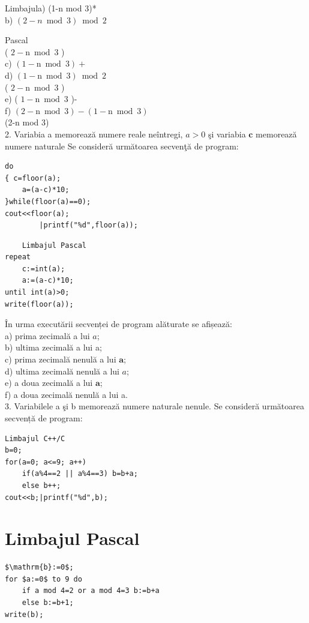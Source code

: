 \documentclass[10pt]{article}
\begin{document}
Limbajula) (1-n mod 3)*\\
b) $(2-n \bmod 3) \bmod 2$

Pascal\\
( $2-\mathrm{n} \bmod 3$ )\\
c) $(1-\mathrm{n} \bmod 3)+$\\
d) $(1-\mathrm{n} \bmod 3) \bmod 2$\\
( $2-\mathrm{n} \bmod 3$ )\\
e) ( $1-\mathrm{n} \bmod 3$ )-\\
f) $(2-\mathrm{n} \bmod 3)-(1-\mathrm{n} \bmod 3)$\\
(2-n mod 3)\\
2. Variabia a memorează numere reale neîntregi, $a>0$ şi variabia $\mathbf{c}$ memorează numere naturale Se consideră următoarea secvenţă de program:

\begin{verbatim}
do
{ c=floor(a);
    a=(a-c)*10;
}while(floor(a)==0);
cout<<floor(a);
        |printf("%d",floor(a));
\end{verbatim}

\begin{verbatim}
    Limbajul Pascal
repeat
    c:=int(a);
    a:=(a-c)*10;
until int(a)>0;
write(floor(a));
\end{verbatim}

În urma executării secvenței de program alăturate se afișează:\\
a) prima zecimală a lui $a$;\\
b) ultima zecimală a lui a;\\
c) prima zecimală nenulă a lui $\mathbf{a}$;\\
d) ultima zecimală nenulă a lui $a$;\\
e) a doua zecimală a lui $\mathbf{a}$;\\
f) a doua zecimală nenulă a lui a.\\
3. Variabilele a şi b memorează numere naturale nenule. Se consideră următoarea secvență de program:

\begin{verbatim}
Limbajul C++/C
b=0;
for(a=0; a<=9; a++)
    if(a%4==2 || a%4==3) b=b+a;
    else b++;
cout<<b;|printf("%d",b);
\end{verbatim}

\section*{Limbajul Pascal}
\begin{verbatim}
$\mathrm{b}:=0$;
for $a:=0$ to 9 do
    if a mod 4=2 or a mod 4=3 b:=b+a
    else b:=b+1;
write(b);
\end{verbatim}
\end{document}
